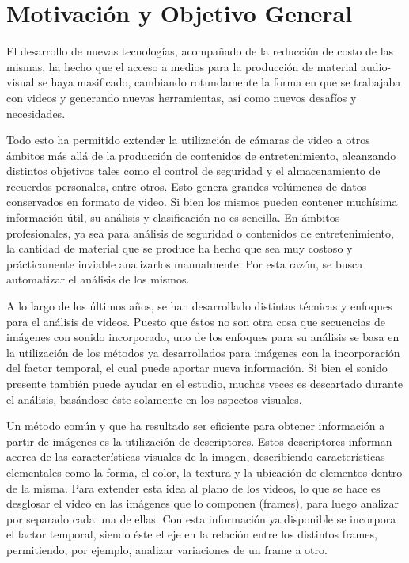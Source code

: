\section{Motivación y Objetivo General}
\iffalse
Explique el problema o situación de referencia en el que se desarrolla la
propuesta o los interrogantes en el campo disciplinario a los que la propuesta se
dirige. Desarrolle la importancia e impacto de los objetivos y el conocimiento
que se generará. En esta sección no es necesario describir las tareas específicas
que se realizarán (para eso, ver Objetivos específicos).
\fi

El desarrollo de nuevas tecnologías, acompañado de la reducción de costo de las mismas, ha hecho que el acceso a medios para la 
producción de material audio-visual se haya masificado, cambiando rotundamente la forma en que se trabajaba con videos y generando nuevas
herramientas, así como nuevos desafíos y necesidades.

Todo esto ha permitido extender la utilización de cámaras de video a otros ámbitos más allá de la producción de contenidos de entretenimiento,
alcanzando distintos objetivos tales como el control de seguridad y el almacenamiento de recuerdos personales, entre otros.
Esto genera grandes volúmenes de datos conservados en formato de video. 
Si bien los mismos pueden contener muchísima información útil, su análisis y clasificación no es sencilla. En ámbitos profesionales,
ya sea para análisis de seguridad o contenidos de entretenimiento, la cantidad de material que se produce ha hecho que sea muy costoso y prácticamente
inviable analizarlos manualmente. Por esta razón, se busca automatizar el análisis de los mismos.

A lo largo de los últimos años, se han desarrollado distintas técnicas y enfoques para el análisis de videos.
Puesto que éstos no son otra cosa que secuencias de imágenes con sonido incorporado, uno de los enfoques para su análisis
se basa en la utilización de los métodos ya desarrollados para imágenes con la incorporación del factor temporal, el cual puede
aportar nueva información. Si bien el sonido presente también puede ayudar en el estudio, muchas veces es descartado durante el análisis,
basándose éste solamente en los aspectos visuales.

Un método común y que ha resultado ser eficiente para obtener información a partir de imágenes es la utilización de descriptores.
Estos descriptores informan acerca de las características visuales de la imagen, describiendo características elementales como la forma, el color,
la textura y la ubicación de elementos dentro de la misma.
Para extender esta idea al plano de los videos, lo que se hace es desglosar el video en las imágenes que lo componen (frames), para luego analizar por separado
cada una de ellas. Con esta información ya disponible se incorpora el factor temporal, siendo éste el eje en la relación entre los distintos frames, permitiendo,
por ejemplo, analizar variaciones de un frame a otro.
